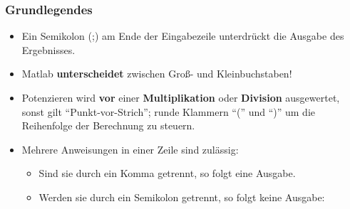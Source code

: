     \begin{frame}
      \frametitle{Grundlegendes}
      \begin{itemize}
        \item Ein Semikolon (;) am Ende der Eingabezeile unterdrückt die Ausgabe des Ergebnisses.
        \item Matlab \textbf{unterscheidet} zwischen Groß- und Kleinbuchstaben!
        \item Potenzieren wird \textbf{vor} einer \textbf{Multiplikation} oder \textbf{Division} ausgewertet, sonst gilt ``Punkt-vor-Strich''; runde Klammern ``('' und ``)'' um die Reihenfolge der Berechnung zu steuern.
        \item Mehrere Anweisungen in einer Zeile sind zulässig:

        \begin{itemize}
          \item Sind sie durch ein Komma getrennt, so folgt eine Ausgabe.
          \item Werden sie durch ein Semikolon getrennt, so folgt keine Ausgabe:

          \vspace{0.3cm}

          \begin{columns}[t]
            \begin{column}{5cm}
              \colorbox{bg}{}
            \end{column}

            \begin{column}{5cm}
              \colorbox{bg}{}
            \end{column}
          \end{columns}

        \end{itemize}
      \end{itemize}
    \end{frame}




